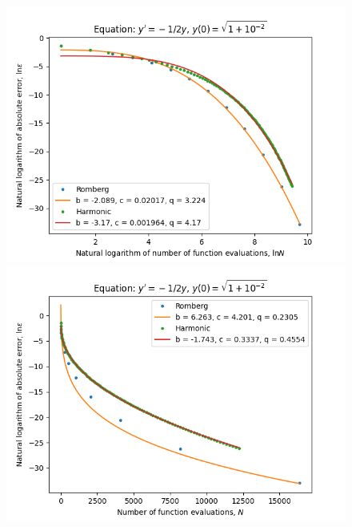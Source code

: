 \begin{figure}[H]
\centering
\begin{minipage}{0.45\textwidth}
\centering
\includegraphics[scale=0.45]{emr_plots/quad_sing_2_hp_log_log_pow_fit_trend.png}
\end{minipage}
\begin{minipage}{0.45\textwidth}
\centering
\includegraphics[scale=0.45]{emr_plots/quad_sing_2_hp_trend.png}
\end{minipage}
\end{figure}

